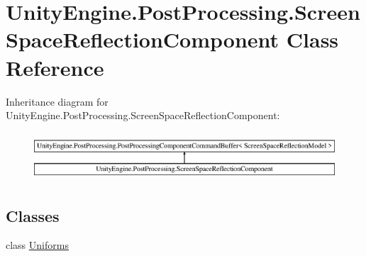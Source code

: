 \hypertarget{class_unity_engine_1_1_post_processing_1_1_screen_space_reflection_component}{}\section{Unity\+Engine.\+Post\+Processing.\+Screen\+Space\+Reflection\+Component Class Reference}
\label{class_unity_engine_1_1_post_processing_1_1_screen_space_reflection_component}
Inheritance diagram for Unity\+Engine.\+Post\+Processing.\+Screen\+Space\+Reflection\+Component\+:\begin{figure}[H]
\begin{center}
\leavevmode
\includegraphics[height=1.824104cm]{class_unity_engine_1_1_post_processing_1_1_screen_space_reflection_component}
\end{center}
\end{figure}
\subsection*{Classes}
\begin{DoxyCompactItemize}
\item 
class \hyperlink{class_unity_engine_1_1_post_processing_1_1_screen_space_reflection_component_1_1_uniforms}{Uniforms}
\end{DoxyCompactItemize}
